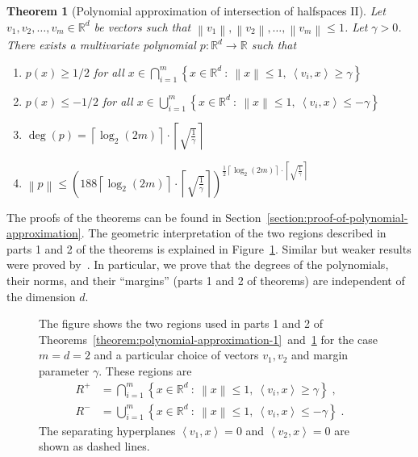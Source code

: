 \documentclass[12pt]{article}
\newtheorem{theorem}[definition]{Theorem}
\newcommand{\R}{\mathbb{R}}  %
\newcommand{\ip}[2]{\left\langle #1, #2 \right\rangle} %
\newcommand{\norm}[1]{\left\| #1 \right\|}  %
\begin{document}
\begin{theorem}[Polynomial approximation of intersection of halfspaces II]
\label{theorem:polynomial-approximation-2}
Let $v_1, v_2, \dots, v_m \in \R^d$ be vectors such that $\norm{v_1},
\norm{v_2}, \dots, \norm{v_m} \le 1$. Let $\gamma > 0$. There exists a
multivariate polynomial $p:\R^d \to \R$ such that
\begin{enumerate}
\item $p(x) \ge 1/2$ for all $\displaystyle x \in \bigcap_{i=1}^m \left\{ x \in \R^d ~:~ \norm{x} \le 1, \ \ip{v_i}{x} \ge \gamma \right\}$
\item $p(x) \le -1/2$ for all $\displaystyle x \in \bigcup_{i=1}^m \left\{ x \in \R^d ~:~ \norm{x} \le 1, \ \ip{v_i}{x} \le - \gamma \right\}$
\item $\displaystyle \deg(p) = \left\lceil \log_2(2m) \right\rceil \cdot \left\lceil \sqrt{\frac{1}{\gamma}} \right\rceil$
\item $\displaystyle \norm{p} \le \left( 188 \left\lceil \log_2(2m) \right\rceil \cdot \left\lceil \sqrt{\frac{1}{\gamma}} \right\rceil \right)^{\frac{1}{2} \left\lceil \log_2(2m) \right\rceil \cdot \left\lceil \sqrt{\frac{1}{\gamma}} \right\rceil}$
\end{enumerate}
\end{theorem}

The proofs of the theorems can be found in
Section~\ref{section:proof-of-polynomial-approximation}. The geometric
interpretation of the two regions described in parts 1 and 2 of the theorems is
explained in Figure~\ref{figure:pizza-slice}. Similar but weaker results were
proved by~\cite{Klivans-Servedio-2008}. In particular, we prove that the degrees
of the polynomials, their norms, and their ``margins'' (parts 1 and 2 of theorems)
are independent of the dimension $d$.


\begin{figure}
\begin{center}

\end{center}
\caption[]{The figure shows the two regions used in parts 1 and 2 of
Theorems~\ref{theorem:polynomial-approximation-1}~and~\ref{theorem:polynomial-approximation-2}
for the case $m=d=2$ and a particular choice of vectors $v_1, v_2$ and margin
parameter $\gamma$. These regions are
\begin{align*}
R^+ & = \displaystyle \bigcap_{i=1}^m \left\{ x \in \R^d ~:~ \norm{x} \le 1, \ \ip{v_i}{x} \ge \gamma \right\} \; , \\
R^- & = \displaystyle \bigcup_{i=1}^m \left\{ x \in \R^d ~:~ \norm{x} \le 1, \ \ip{v_i}{x} \le - \gamma \right\} \; .
\end{align*}
The separating hyperplanes $\ip{v_1}{x} = 0$ and $\ip{v_2}{x} = 0$ are shown as dashed lines.
}
\label{figure:pizza-slice}
\end{figure}
\end{document}
